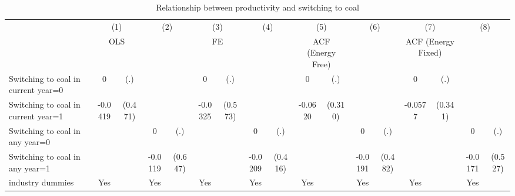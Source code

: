 \begin{table}[htbp]\centering
\def\sym#1{\ifmmode^{#1}\else\(^{#1}\)\fi}
\caption{Relationship between productivity and switching to coal}
\begin{tabular}{l*{8}{cc}}
\toprule
                    &\multicolumn{2}{c}{(1)}           &\multicolumn{2}{c}{(2)}           &\multicolumn{2}{c}{(3)}           &\multicolumn{2}{c}{(4)}           &\multicolumn{2}{c}{(5)}           &\multicolumn{2}{c}{(6)}           &\multicolumn{2}{c}{(7)}           &\multicolumn{2}{c}{(8)}           \\
                    &\multicolumn{2}{c}{OLS}           &\multicolumn{2}{c}{}              &\multicolumn{2}{c}{FE}            &\multicolumn{2}{c}{}              &\multicolumn{2}{c}{ACF (Energy Free)}&\multicolumn{2}{c}{}              &\multicolumn{2}{c}{ACF (Energy Fixed)}&\multicolumn{2}{c}{}              \\
\midrule
Switching to coal in current year=0&           0         &         (.)&                     &            &           0         &         (.)&                     &            &           0         &         (.)&                     &            &           0         &         (.)&                     &            \\
Switching to coal in current year=1&     -0.0419         &     (0.471)&                     &            &     -0.0325         &     (0.573)&                     &            &     -0.0620         &     (0.310)&                     &            &     -0.0577         &     (0.341)&                     &            \\
Switching to coal in any year=0&                     &            &           0         &         (.)&                     &            &           0         &         (.)&                     &            &           0         &         (.)&                     &            &           0         &         (.)\\
Switching to coal in any year=1&                     &            &     -0.0119         &     (0.647)&                     &            &     -0.0209         &     (0.416)&                     &            &     -0.0191         &     (0.482)&                     &            &     -0.0171         &     (0.527)\\
industry dummies    &         Yes         &            &         Yes         &            &         Yes         &            &         Yes         &            &         Yes         &            &         Yes         &            &         Yes         &            &         Yes         &            \\

\end{tabular}
\end{table}
